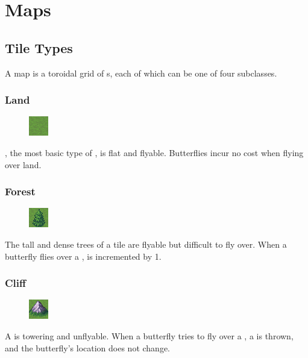\documentclass{pset}
\begin{document}
\section{Maps}\label{sec:maps}
\ifx \TILETYPES \undefined \else
\subsection{Tile Types}
A map is a toroidal grid of s, each of which can be one of four
subclasses.
\subsubsection{Land}
\begin{figure}
    \centering
    \vspace{-20pt}
    \includegraphics{img/land.png}
    \vspace{-20pt}
\end{figure}
, the most basic type of , is flat and flyable.
Butterflies incur no cost when flying over land.

\subsubsection{Forest}
\begin{figure}
    \centering
    \vspace{-20pt}
    \includegraphics{img/forest_land.png}
    \vspace{-20pt}
\end{figure}
The tall and dense trees of a  tile are flyable but difficult to
fly over. When a butterfly flies over a ,  is
incremented by 1.

\subsubsection{Cliff}
\begin{figure}
    \centering
    \vspace{-20pt}
    \includegraphics{img/cliff_land.png}
    \vspace{-20pt}
\end{figure}
A  is towering and unflyable. When a butterfly tries to fly over a
, a  is thrown, and the butterfly's
location does not change.
\end{document}
